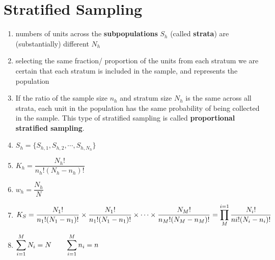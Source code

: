 \section{Stratified Sampling \cite{ism-1}}\label{Stratified Sampling}

\begin{enumerate}
    \item numbers of units across the \textbf{subpopulations} $S_h$ (called \textbf{strata}) are (substantially) different $N_h$

    \item selecting the same fraction/ proportion of the units from each stratum we are certain that each stratum is included in the sample, and represents the population

    \item If the ratio of the sample size $n_h$ and stratum size $N_h$ is the same across all strata, each unit in the population has the same probability of being collected in the sample. This type of stratified sampling is called \textbf{proportional stratified sampling}.

    \item[] $S_h = \{ S_{h,1}, S_{h,2},\cdots, S_{h,N_h} \}$

    \item[] $K_h = \dfrac{N_h!}{n_h!(N_h-n_h)!}$

    \item[] $w_h = \dfrac{N_h}{N}$

    \item[] $
        K_S = 
        \dfrac{N_1!}{n_1!(N_1-n_1)!} 
        \times
        \dfrac{N_1!}{n_1!(N_1-n_1)!} 
        \times
        \cdots
        \times
        \dfrac{N_M!}{n_M!(N_M-n_M)!}
        =
        \displaystyle\prod_{M}^{i=1} \dfrac{N_i!}{ni!(N_i-n_i)!}
    $

    \item[] $
        \displaystyle\sum_{i=1}^{M} N_i = N
        \quad\quad
        \displaystyle\sum_{i=1}^{M} n_i = n
    $


\end{enumerate}

